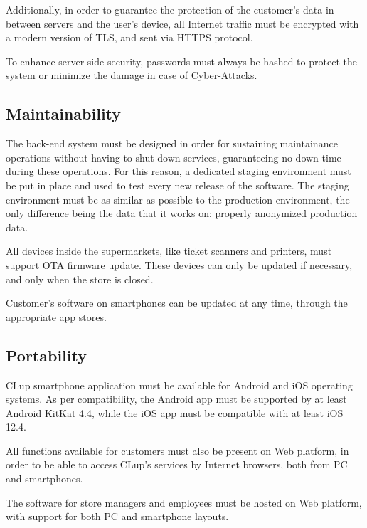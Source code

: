 \documentclass[../../main.tex]{subfiles}
\begin{document}
	Additionally, in order to guarantee the protection of the customer's data in between servers and the 
	user's device, all Internet traffic must be encrypted with a modern version of TLS, and sent via HTTPS protocol.

	To enhance server-side security, passwords must always be hashed to protect the system or minimize the damage 
	in case of Cyber-Attacks. 

	\subsection{Maintainability}

	The back-end system must be designed in order for sustaining maintainance operations without having to 
	shut down services, guaranteeing no down-time during these operations. For this reason, a dedicated staging environment must be put in place and used to test every new release of the software. The staging environment must be as similar as possible to the production environment, the only difference being the data that it works on: properly anonymized production data.

	All devices inside the supermarkets, like ticket scanners and printers, must support OTA firmware update. These devices can only be updated if necessary, and only when the store is closed.

	Customer's software on smartphones can be updated at any time, through the appropriate app stores.

	\subsection{Portability}

	CLup smartphone application must be available for Android and iOS operating systems. As per compatibility, the Android app must be supported by at least Android KitKat 4.4, while the iOS app must be compatible with at least iOS 12.4.

	All functions available for customers must also be present on Web platform, in order to be able to access 
	CLup's services by Internet browsers, both from PC and smartphones.

	The software for store managers and employees must be hosted on Web platform, with support for both PC and smartphone layouts.

	
\end{document}
